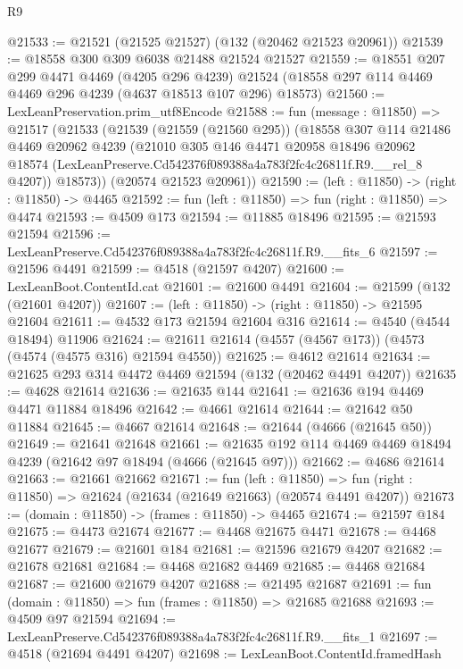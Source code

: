 \begin{lexlean}{R9}
\begin{coremodule}
@21533 := @21521 (@21525 @21527) (@132 (@20462 @21523 @20961))
@21539 := @18558 @300 @309 @6038 @21488 @21524 @21527
@21559 := @18551
    @207
    @299
    @4471
    @4469
    (@4205 @296 @4239)
    @21524
    (@18558 @297 @114 @4469 @4469 @296 @4239 (@4637 @18513 @107 @296) @18573)
@21560 := LexLeanPreservation.prim_utf8Encode
@21588 := fun (message : @11850) =>
  @21517
    (@21533
      (@21539
        (@21559 (@21560 @295))
        (@18558
          @307
          @114
          @21486
          @4469
          @20962
          @4239
          (@21010
            @305
            @146
            @4471
            @20958
            @18496
            @20962
            @18574
            (LexLeanPreserve.Cd542376f089388a4a783f2fc4c26811f.R9.__rel_8 @4207))
          @18573))
      (@20574 @21523 @20961))
@21590 := (left : @11850) -> (right : @11850) -> @4465
@21592 := fun (left : @11850) => fun (right : @11850) => @4474
@21593 := @4509 @173
@21594 := @11885 @18496
@21595 := @21593 @21594
@21596 := LexLeanPreserve.Cd542376f089388a4a783f2fc4c26811f.R9.__fits_6
@21597 := @21596 @4491
@21599 := @4518 (@21597 @4207)
@21600 := LexLeanBoot.ContentId.cat
@21601 := @21600 @4491
@21604 := @21599 (@132 (@21601 @4207))
@21607 := (left : @11850) -> (right : @11850) -> @21595 @21604
@21611 := @4532 @173 @21594 @21604 @316
@21614 := @4540 (@4544 @18494) @11906
@21624 := @21611 @21614 (@4557 (@4567 @173)) (@4573 (@4574 (@4575 @316) @21594 @4550))
@21625 := @4612 @21614
@21634 := @21625 @293 @314 @4472 @4469 @21594 (@132 (@20462 @4491 @4207))
@21635 := @4628 @21614
@21636 := @21635 @144
@21641 := @21636 @194 @4469 @4471 @11884 @18496
@21642 := @4661 @21614
@21644 := @21642 @50 @11884
@21645 := @4667 @21614
@21648 := @21644 (@4666 (@21645 @50))
@21649 := @21641 @21648
@21661 := @21635 @192 @114 @4469 @4469 @18494 @4239 (@21642 @97 @18494 (@4666 (@21645 @97)))
@21662 := @4686 @21614
@21663 := @21661 @21662
@21671 := fun (left : @11850) =>
  fun (right : @11850) => @21624 (@21634 (@21649 @21663) (@20574 @4491 @4207))
@21673 := (domain : @11850) -> (frames : @11850) -> @4465
@21674 := @21597 @184
@21675 := @4473 @21674
@21677 := @4468 @21675 @4471
@21678 := @4468 @21677
@21679 := @21601 @184
@21681 := @21596 @21679 @4207
@21682 := @21678 @21681
@21684 := @4468 @21682 @4469
@21685 := @4468 @21684
@21687 := @21600 @21679 @4207
@21688 := @21495 @21687
@21691 := fun (domain : @11850) => fun (frames : @11850) => @21685 @21688
@21693 := @4509 @97 @21594
@21694 := LexLeanPreserve.Cd542376f089388a4a783f2fc4c26811f.R9.__fits_1
@21697 := @4518 (@21694 @4491 @4207)
@21698 := LexLeanBoot.ContentId.framedHash

\end{coremodule}
\end{lexlean}
